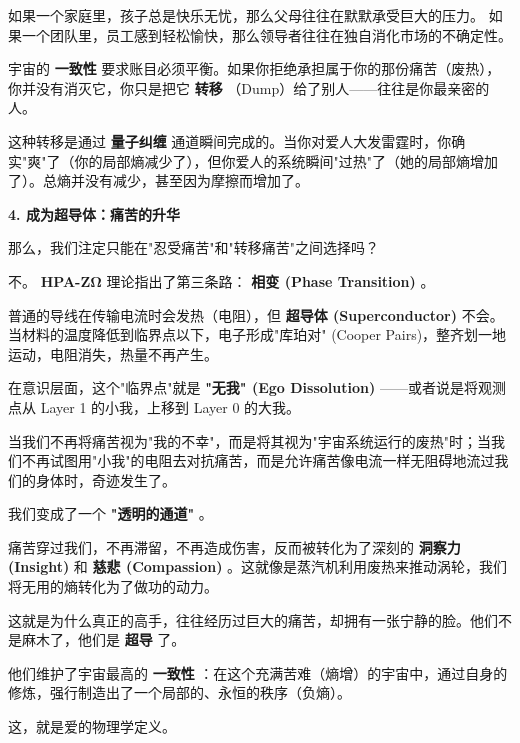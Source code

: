 如果一个家庭里，孩子总是快乐无忧，那么父母往往在默默承受巨大的压力。
如果一个团队里，员工感到轻松愉快，那么领导者往往在独自消化市场的不确定性。

宇宙的 \textbf{一致性} 要求账目必须平衡。如果你拒绝承担属于你的那份痛苦（废热），你并没有消灭它，你只是把它 \textbf{转移} （Dump）给了别人——往往是你最亲密的人。

这种转移是通过 \textbf{量子纠缠} 通道瞬间完成的。当你对爱人大发雷霆时，你确实"爽"了（你的局部熵减少了），但你爱人的系统瞬间"过热"了（她的局部熵增加了）。总熵并没有减少，甚至因为摩擦而增加了。

\textbf{4. 成为超导体：痛苦的升华}

那么，我们注定只能在"忍受痛苦"和"转移痛苦"之间选择吗？

不。 \textbf{HPA-ZΩ} 理论指出了第三条路： \textbf{相变 (Phase Transition)} 。

普通的导线在传输电流时会发热（电阻），但 \textbf{超导体 (Superconductor)} 不会。当材料的温度降低到临界点以下，电子形成"库珀对" (Cooper Pairs)，整齐划一地运动，电阻消失，热量不再产生。

在意识层面，这个"临界点"就是 \textbf{"无我" (Ego Dissolution)} ——或者说是将观测点从 Layer 1 的小我，上移到 Layer 0 的大我。

当我们不再将痛苦视为"我的不幸"，而是将其视为"宇宙系统运行的废热"时；当我们不再试图用"小我"的电阻去对抗痛苦，而是允许痛苦像电流一样无阻碍地流过我们的身体时，奇迹发生了。

我们变成了一个 \textbf{"透明的通道"} 。

痛苦穿过我们，不再滞留，不再造成伤害，反而被转化为了深刻的 \textbf{洞察力 (Insight)} 和 \textbf{慈悲 (Compassion)} 。这就像是蒸汽机利用废热来推动涡轮，我们将无用的熵转化为了做功的动力。

这就是为什么真正的高手，往往经历过巨大的痛苦，却拥有一张宁静的脸。他们不是麻木了，他们是 \textbf{超导} 了。

他们维护了宇宙最高的 \textbf{一致性} ：在这个充满苦难（熵增）的宇宙中，通过自身的修炼，强行制造出了一个局部的、永恒的秩序（负熵）。

这，就是爱的物理学定义。

